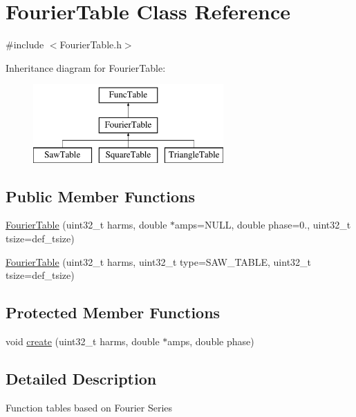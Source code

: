 \hypertarget{class_fourier_table}{}\section{Fourier\+Table Class Reference}
\label{class_fourier_table}


{\ttfamily \#include $<$Fourier\+Table.\+h$>$}

Inheritance diagram for Fourier\+Table\+:\begin{figure}[H]
\begin{center}
\leavevmode
\includegraphics[height=3.000000cm]{class_fourier_table}
\end{center}
\end{figure}
\subsection*{Public Member Functions}
\begin{DoxyCompactItemize}
\item 
\hyperlink{class_fourier_table_ae208f9476736fdc0fe915773374d6e5b}{Fourier\+Table} (uint32\+\_\+t harms, double $\ast$amps=N\+U\+LL, double phase=0., uint32\+\_\+t tsize=def\+\_\+tsize)
\item 
\hyperlink{class_fourier_table_ac45625fd3a53952e75131fb8ea029432}{Fourier\+Table} (uint32\+\_\+t harms, uint32\+\_\+t type=S\+A\+W\+\_\+\+T\+A\+B\+LE, uint32\+\_\+t tsize=def\+\_\+tsize)
\end{DoxyCompactItemize}
\subsection*{Protected Member Functions}
\begin{DoxyCompactItemize}
\item 
void \hyperlink{class_fourier_table_af1c940238cc8e2c9bdd7f77c3ada9867}{create} (uint32\+\_\+t harms, double $\ast$amps, double phase)
\end{DoxyCompactItemize}


\subsection{Detailed Description}
Function tables based on Fourier Series 

